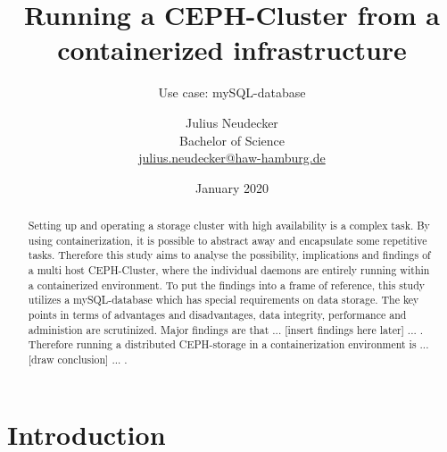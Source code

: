 \documentclass[titlepage, a4paper, 11pt]{scrartcl}
\title{Running a CEPH-Cluster from a containerized infrastructure}
\subtitle{Use case: mySQL-database}
\author{Julius Neudecker \\ Bachelor of Science \\ \href{mailto:julius.neudecker@haw-hamburg.de}{julius.neudecker@haw-hamburg.de}}
\date{January 2020}
\begin{document}
    \maketitle

    \tableofcontents

    \begin{abstract}


        Setting up and operating a storage cluster with high availability is a complex task. 
        By using containerization, it is possible to abstract away and encapsulate some repetitive tasks.
        Therefore this study aims to analyse the possibility, implications and findings of a multi host
        CEPH-Cluster, where the individual daemons are entirely running within a containerized environment.
        To put the findings into a frame of reference, this study utilizes a mySQL-database which has 
        special requirements on data storage. The key points in terms of advantages and disadvantages,
        data integrity, performance and administion are scrutinized. Major findings are that ...
        [insert findings here later] ... .
        Therefore running a distributed CEPH-storage in a containerization environment is ... 
        [draw conclusion] ... .



    \end{abstract}

    \section{Introduction}
\end{document}
